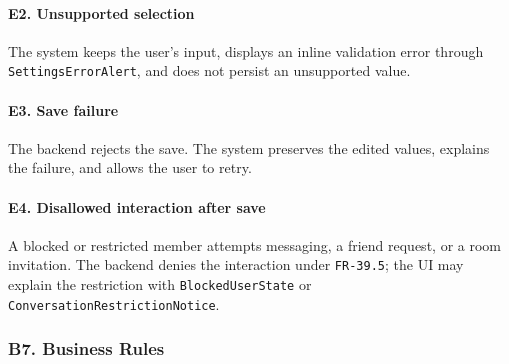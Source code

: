 \documentclass[12pt]{article}
\begin{document}
\paragraph*{E2. Unsupported selection}
\par\medskip

The system keeps the user's input, displays an inline validation error through \texttt{SettingsErrorAlert}, and does not persist an unsupported value.
\par\medskip

\hypertarget{sec:e3-save-failure}{}
\paragraph*{E3. Save failure}
\par\medskip

The backend rejects the save. The system preserves the edited values, explains the failure, and allows the user to retry.
\par\medskip

\hypertarget{sec:e4-disallowed-interaction-after-save}{}
\paragraph*{E4. Disallowed interaction after save}
\par\medskip

A blocked or restricted member attempts messaging, a friend request, or a room invitation. The backend denies the interaction under \texttt{FR-39.5}; the UI may explain the restriction with \texttt{BlockedUserState} or \texttt{ConversationRestrictionNotice}.
\par\medskip

\hypertarget{sec:b7-business-rules}{}
\subsubsection*{B7. Business Rules}
\par\medskip
\end{document}
